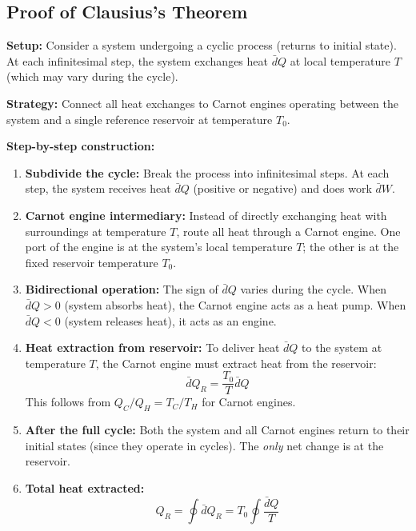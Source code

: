 \documentclass[9pt,twocoloumn]{article}
\begin{document}
\subsection{Proof of Clausius's Theorem}

\textbf{Setup:} Consider a system undergoing a cyclic process (returns to initial state). At each infinitesimal step, the system exchanges heat $\bar{d}Q$ at local temperature $T$ (which may vary during the cycle).

\textbf{Strategy:} Connect all heat exchanges to Carnot engines operating between the system and a single reference reservoir at temperature $T_0$.

\textbf{Step-by-step construction:}

\begin{enumerate}
    \item \textbf{Subdivide the cycle:} Break the process into infinitesimal steps. At each step, the system receives heat $\bar{d}Q$ (positive or negative) and does work $\bar{d}W$.

    \item \textbf{Carnot engine intermediary:} Instead of directly exchanging heat with surroundings at temperature $T$, route all heat through a Carnot engine. One port of the engine is at the system's local temperature $T$; the other is at the fixed reservoir temperature $T_0$.

    \item \textbf{Bidirectional operation:} The sign of $\bar{d}Q$ varies during the cycle. When $\bar{d}Q > 0$ (system absorbs heat), the Carnot engine acts as a heat pump. When $\bar{d}Q < 0$ (system releases heat), it acts as an engine.

    \item \textbf{Heat extraction from reservoir:} To deliver heat $\bar{d}Q$ to the system at temperature $T$, the Carnot engine must extract heat from the reservoir:
    \begin{equation}
    \bar{d}Q_R = \frac{T_0}{T} \bar{d}Q
    \end{equation}
    This follows from $Q_C/Q_H = T_C/T_H$ for Carnot engines.

    \item \textbf{After the full cycle:} Both the system and all Carnot engines return to their initial states (since they operate in cycles). The \emph{only} net change is at the reservoir.

    \item \textbf{Total heat extracted:}
    \begin{equation}
    Q_R = \oint \bar{d}Q_R = T_0 \oint \frac{\bar{d}Q}{T}
    \end{equation}


\end{enumerate}
\end{document}
